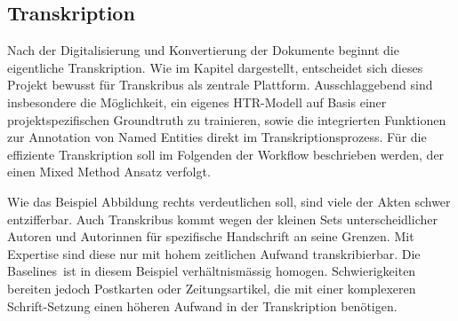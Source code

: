 \documentclass[12pt, a4paper, ngerman, bidi=default]{article}
\begin{document}
\subsection{Transkription}
Nach der Digitalisierung und Konvertierung der Dokumente beginnt die eigentliche Transkription. 
Wie im Kapitel  dargestellt, 
entscheidet sich dieses Projekt bewusst für Transkribus als zentrale Plattform. 
Ausschlaggebend sind insbesondere die Möglichkeit, ein eigenes HTR-Modell auf Basis einer projektspezifischen Groundtruth zu trainieren, 
sowie die integrierten Funktionen zur Annotation von Named Entities direkt im Transkriptionsprozess.
Für die effiziente Transkription soll im Folgenden der Workflow beschrieben werden, der einen Mixed Method Ansatz verfolgt. 

\begin{minipage}[t]{0.52\textwidth}
  \justifying
  \noindent
Wie das Beispiel Abbildung  rechts verdeutlichen soll, sind viele der Akten schwer entzifferbar. Auch Transkribus kommt wegen der kleinen
Sets unterscheidlicher Autoren und Autorinnen für spezifische Handschrift an seine Grenzen. Mit Expertise sind diese nur mit hohem zeitlichen Aufwand transkribierbar. 
Die Baselines\footnotemark~ist in diesem Beispiel verhältnismässig homogen. Schwierigkeiten bereiten jedoch Postkarten oder Zeitungsartikel, die mit einer komplexeren 
Schrift-Setzung einen höheren Aufwand in der Transkription benötigen. 
\noindent
\end{minipage}%
\hfill%
\end{document}
